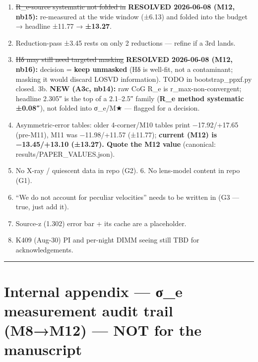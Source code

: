 \documentclass[
]{article}
\providecommand{\tightlist}{%
  \setlength{\itemsep}{0pt}\setlength{\parskip}{0pt}}
\newcommand{\BreakablePath}[1]{{\ttfamily\sloppy #1}}
\begin{document}
\begin{enumerate}
\def\labelenumi{\arabic{enumi}.}
\tightlist
\item
  \sout{R\_e-source systematic not folded in} \textbf{RESOLVED
  2026-06-08 (M12, nb15):} re-measured at the wide window (±6.13) and
  folded into the budget → headline ±11.77 → \textbf{±13.27}.
\item
  Reduction-pass ±3.45 rests on only 2 reductions --- refine if a 3rd
  lands.
\item
  \sout{Hδ may still need targeted masking} \textbf{RESOLVED 2026-06-08
  (M12, nb16):} decision = \textbf{keep unmasked} (Hδ is well-fit, not a
  contaminant; masking it would discard LOSVD information). TODO in
  \BreakablePath{bootstrap\_\discretionary{}{}{}ppxf.\discretionary{}{}{}py}
  closed. 3b. \textbf{NEW (A3c, nb14):} raw CoG R\_e is
  r\_max-non-convergent; headline 2.305″ is the top of a 2.1--2.5″
  family (\textbf{R\_e method systematic ±0.08″}), not folded into
  σ\_e/M★ --- flagged for a decision.
\item
  Asymmetric-error tables: older 4-corner/M10 tables print −17.92/+17.65
  (pre-M11), M11 was −11.98/+11.57 (±11.77); \textbf{current (M12) is
  −13.45/+13.10 (±13.27). Quote the M12 value} (canonical:
  \BreakablePath{results/\discretionary{}{}{}PAPER\_\discretionary{}{}{}VALUES.\discretionary{}{}{}json}).
\item
  No X-ray / quiescent data in repo (G2). 6. No lens-model content in
  repo (G1).
\item
  ``We do not account for peculiar velocities'' needs to be written in
  (G3 --- true, just add it).
\item
  Source-z (1.302) error bar + its cache are a \BreakablePath{[TBD]}
  placeholder.
\item
  K409 (Aug-30) PI and per-night DIMM seeing still TBD for
  acknowledgements.
\end{enumerate}

\begin{center}\rule{0.5\linewidth}{0.5pt}\end{center}

\hypertarget{internal-appendix-ux3c3_e-measurement-audit-trail-m8m12-not-for-the-manuscript}{%
\section{Internal appendix --- σ\_e measurement audit trail (M8→M12) ---
NOT for the
manuscript}\label{internal-appendix-ux3c3_e-measurement-audit-trail-m8m12-not-for-the-manuscript}}
\end{document}
